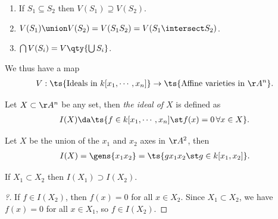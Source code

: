 \begin{proposition}[Properties of $V$]

\envlist

\begin{enumerate}
\def\labelenumi{\arabic{enumi}.}
\tightlist
\item
  If \(S_1 \subseteq S_2\) then \(V(S_1) \supseteq V(S_2)\).
\item
  \(V(S_1) \union V(S_2) = V(S_1 S_2) = V(S_1 \intersect S_2)\).
\item
  \(\bigcap V(S_i) = V\qty{\bigcup S_i}\).
\end{enumerate}

\end{proposition}

We thus have a map
\begin{align*}  
V: \ts{\text{Ideals in } k[x_1, \cdots, x_n]} \to \ts{\text{Affine varieties in } \AA^n}
.\end{align*}

\begin{definition}

Let \(X\subset \AA^n\) be any set, then \emph{the ideal of \(X\)} is
defined as
\begin{align*}  
I(X) \da\ts{f\in k[x_1, \cdots, x_n] \st f(x) = 0\, \forall x\in X}
.\end{align*}

\end{definition}

\begin{example}

Let \(X\) be the union of the \(x_1\) and \(x_2\) axes in \(\AA^2\),
then
\begin{align*}
I(X) = \gens{x_1 x_2} = \ts {g x_1 x_2 \st g\in k[x_1, x_2]}
.\end{align*}

\end{example}

\begin{proposition}

If \(X_1 \subset X_2\) then \(I(X_1) \supset I(X_2)\).

\end{proposition}

\begin{proof}[?]

If \(f\in I(X_2)\), then \(f(x) = 0\) for all \(x\in X_2\). Since
\(X_1 \subset X_2\), we have \(f(x) = 0\) for all \(x\in X_1\), so
\(f\in I(X_2)\).

\end{proof}

